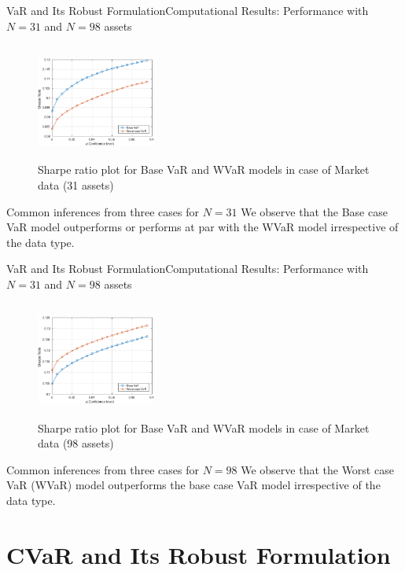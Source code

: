 \documentclass{beamer}
\begin{document}
\begin{frame}{VaR and Its Robust Formulation}{Computational Results: Performance with $N=31$ and $N=98$ assets}
\begin{figure}[!h]
\centering
\includegraphics[height=3.825cm,width=0.35\textwidth]{VaR/bse30_market/sr_cheb.eps}
\caption{Sharpe ratio plot for Base VaR and WVaR models in case of Market data (31 assets)}
\label{fig:5.1}
\end{figure}

\begin{block}{Common inferences from three cases for $N=31$}
We observe that the Base case VaR model outperforms or performs at par with the WVaR model irrespective of the data type.
\end{block}
\end{frame}

\begin{frame}{VaR and Its Robust Formulation}{Computational Results: Performance with $N=31$ and $N=98$ assets}
\begin{figure}[!h]
\centering
\includegraphics[height=3.825cm,width=0.35\textwidth]{VaR/bse100_market/sr_cheb.eps}
\caption{Sharpe ratio plot for Base VaR and WVaR models in case of Market data (98 assets)}
\label{fig:5.4}
\end{figure}

\begin{block}{Common inferences from three cases for $N=98$}
We observe that the Worst case VaR (WVaR) model outperforms the base case VaR model irrespective of the data type.
\end{block}

\end{frame}

\section{CVaR and Its Robust Formulation}
\end{document}
